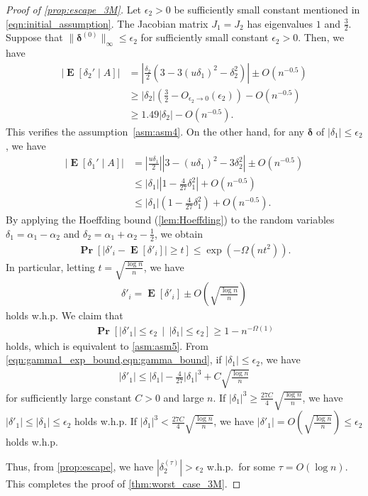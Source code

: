 \documentclass[letterpaper,11pt]{article}
\renewcommand\Pr{\mathop{\mathbf{Pr}}}
\DeclareMathOperator{\E}{\mathbf{E}}
\begin{document}
\begin{proof}[Proof of \cref{prop:escape_3M}]
Let $\epsilon_2>0$ be sufficiently small constant mentioned in \cref{eqn:initial_assumption}.
The Jacobian matrix $J_1=J_2$ has eigenvalues $1$ and $\frac{3}{2}$.
Suppose that $\|{\boldsymbol \delta}^{(0)}\|_\infty \leq \epsilon_2$ for sufficiently small constant $\epsilon_2>0$.
Then, we have
\begin{align*}
|\E[\delta_2' \mid A]|&=\left|\frac{\delta_2}{2}(3-3(u\delta_1)^2-\delta_2^2)\right| \pm O(n^{-0.5})  \\
& \geq |\delta_2|\left(\frac{3}{2} - O_{\epsilon_2\to 0}(\epsilon_2)\right) - O(n^{-0.5})  \\
&\geq 1.49 |\delta_2| - O(n^{-0.5}).
\end{align*}
This verifies the assumption~\ref{asm:asm4}.
On the other hand, for any ${\boldsymbol \delta}$ of $|\delta_1|\leq\epsilon_2$, we have
\begin{align}
\left|\E[\delta_1' \mid A]\right|&=\left|\frac{u\delta_1}{2}\right|\left|3-(u\delta_1)^2-3\delta_2^2\right| \pm O(n^{-0.5}) \nonumber\\
&\leq |\delta_1|\left|1 - \frac{4}{27} \delta_1^2\right| + O(n^{-0.5}) \nonumber\\
&\leq |\delta_1|\left(1 - \frac{4}{27} \delta_1^2\right) + O(n^{-0.5}). \label{eqn:gamma1_exp_bound}
\end{align}
By applying the Hoeffding bound (\cref{lem:Hoeffding}) to the random variables $\delta_1=\alpha_1-\alpha_2$ and $\delta_2=\alpha_1+\alpha_2-\frac{1}{2}$, we obtain
\begin{align*}
\Pr\left[|\delta'_i-\E[\delta'_i]|\geq t\right] \leq \exp\left(-\Omega\left(nt^2\right)\right).
\end{align*}
In particular, letting $t=\sqrt{\frac{\log n}{n}}$, we have
\begin{align}
\delta'_i=\E[\delta'_i] \pm O\left(\sqrt{\frac{\log n}{n}}\right) \label{eqn:gamma_bound}
\end{align}
holds w.h.p.
We claim that 
\begin{align*}
\Pr\left[|\delta'_1|\leq\epsilon_2 \,\middle|\,|\delta_1|\leq\epsilon_2\right] \geq 1-n^{-\Omega(1)} 
\end{align*}
holds, which is equivalent to \ref{asm:asm5}.
From \cref{eqn:gamma1_exp_bound,eqn:gamma_bound}, if $|\delta_1|\leq\epsilon_2$, we have
\begin{align*}
|\delta'_1| \leq |\delta_1| - \frac{4}{27}|\delta_1|^3 + C\sqrt{\frac{\log n}{n}}
\end{align*}
for sufficiently large constant $C>0$ and large $n$.
If $|\delta_1|^3\geq \frac{27C}{4}\sqrt{\frac{\log n}{n}}$, we have $|\delta'_1|\leq |\delta_1|\leq \epsilon_2$ holds w.h.p.
If $|\delta_1|^3 < \frac{27C}{4}\sqrt{\frac{\log n}{n}}$, we have $|\delta'_1|=O\left(\sqrt{\frac{\log n}{n}}\right)\leq \epsilon_2$ holds w.h.p.

Thus, from \cref{prop:escape}, we have $|\delta^{(\tau)}_2|>\epsilon_2$ w.h.p.~for some $\tau=O(\log n)$.
This completes the proof of \cref{thm:worst_case_3M}. 
\end{proof}
\end{document}
